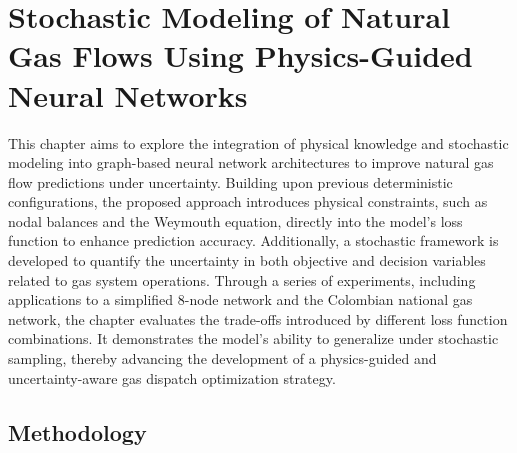 \chapter{Stochastic Modeling of Natural Gas Flows Using Physics-Guided Neural Networks} \label{cap:non_linealcensnet}

This chapter aims to explore the integration of physical knowledge and stochastic modeling into graph-based neural network architectures to improve natural gas flow predictions under uncertainty. Building upon previous deterministic configurations, the proposed approach introduces physical constraints, such as nodal balances and the Weymouth equation, directly into the model’s loss function to enhance prediction accuracy. Additionally, a stochastic framework is developed to quantify the uncertainty in both objective and decision variables related to gas system operations. Through a series of experiments, including applications to a simplified 8-node network and the Colombian national gas network, the chapter evaluates the trade-offs introduced by different loss function combinations. It demonstrates the model’s ability to generalize under stochastic sampling, thereby advancing the development of a physics-guided and uncertainty-aware gas dispatch optimization strategy.


\section{Methodology}

